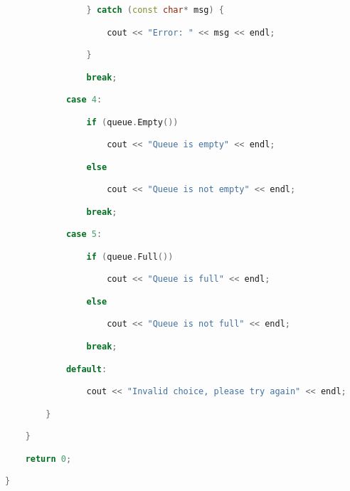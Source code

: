 \begin{lstlisting}[language=C++]
                } catch (const char* msg) {

                    cout << "Error: " << msg << endl;

                }

                break;

            case 4:

                if (queue.Empty())

                    cout << "Queue is empty" << endl;

                else

                    cout << "Queue is not empty" << endl;

                break;

            case 5:

                if (queue.Full())

                    cout << "Queue is full" << endl;

                else

                    cout << "Queue is not full" << endl;

                break;

            default:

                cout << "Invalid choice, please try again" << endl;

        }

    }

    return 0;

}
\end{lstlisting}